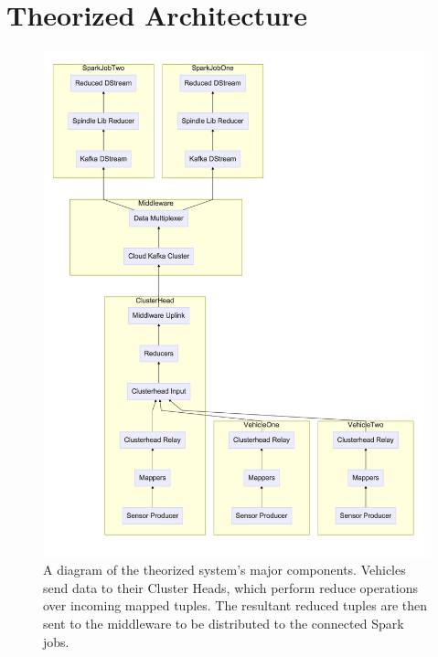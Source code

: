 \documentclass{thesis}
\begin{document}
\section{Theorized Architecture}
    \begin{figure}
        \centering
        \includegraphics[width=\linewidth]{binImages/theoretical-system.png}
        \caption{A diagram of the theorized system's major components. Vehicles
        send data to their Cluster Heads, which perform reduce operations over
        incoming mapped tuples. The resultant reduced tuples are then sent to
        the middleware to be distributed to the connected Spark jobs.}
        \label{fig:theoretical:component}
    \end{figure}
\end{document}
